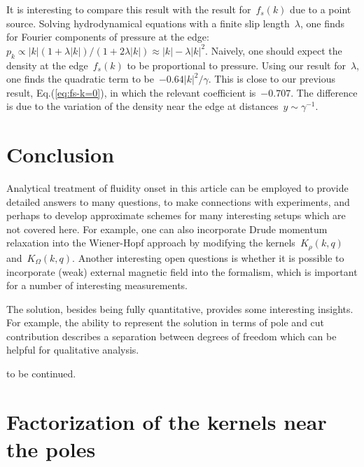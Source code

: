 \documentclass[preprint,aps,eqsecnum]{revtex4-1}
\begin{document}
It is interesting to compare this result with the result for~$f_s(k)$
due to a point source. Solving hydrodynamical equations with a finite
slip length~$\lambda$, one finds for Fourier components of
pressure at the edge:
$p_k \propto |k| (1 + \lambda |k|)/(1 + 2 \lambda|k|)
\approx |k| - \lambda |k|^2$. Naively, one should expect the
density at the edge~$f_s(k)$ to be proportional to pressure.
Using our result for~$\lambda$, one
finds the quadratic term to be~$-0.64 |k|^2/\gamma$. This is close
to our previous result, Eq.(\ref{eq:fs-k=0}), in which the relevant
coefficient is~$-0.707$. The difference is due to the variation
of the density near the edge at distances~$y\sim\gamma^{-1}$. 

\section{Conclusion}
\label{sec:conclusion}



Analytical treatment of fluidity onset in this article can be employed
to provide detailed answers to many questions, to make connections with
experiments, and perhaps to develop approximate schemes for many
interesting setups which are not covered here. 
For example, one can also incorporate Drude momentum relaxation into
the Wiener-Hopf approach by modifying the kernels~$K_\rho(k, q)$
and~$K_\Omega(k, q)$. Another  interesting open questions is whether it is
possible to incorporate (weak) external magnetic field into the formalism,
which is important for a number of interesting measurements.

The solution, besides being fully quantitative, provides some interesting
insights. For example, the ability to represent the solution in terms of
pole and cut contribution describes a separation between degrees of freedom
which can be helpful for qualitative analysis.

to be continued. 



\appendix

\section{Factorization of the kernels near the poles}
\end{document}

